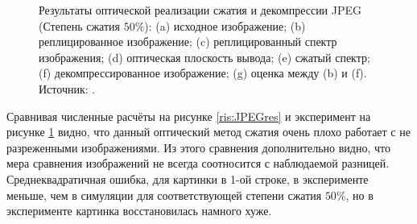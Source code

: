 \begin{figure}[htbp]
	\caption{Результаты оптической реализации сжатия и декомпрессии JPEG (Степень сжатия $50\%$): (a) исходное изображение; (b) реплицированное изображение; (c) реплицированный спектр изображения; (d) оптическая плоскость вывода; (e) сжатый спектр; (f) декомпрессированное изображение; (g) оценка между (b) и (f). Источник: \cite{alkholidi2007new}.}
	\label{ris:JPEGres2}
\end{figure}
Сравнивая численные расчёты на рисунке \ref{ris:JPEGres} и эксперимент на рисунке \ref{ris:JPEGres2} видно, что данный оптический метод сжатия очень плохо работает с не разреженными изображениями. Из этого сравнения дополнительно видно, что мера сравнения изображений не всегда соотносится с наблюдаемой разницей. Среднеквадратичная ошибка, для картинки в 1-ой строке, в эксперименте меньше, чем в симуляции для соответствующей степени сжатия $50\%$, но в эксперименте картинка восстановилась намного хуже.

